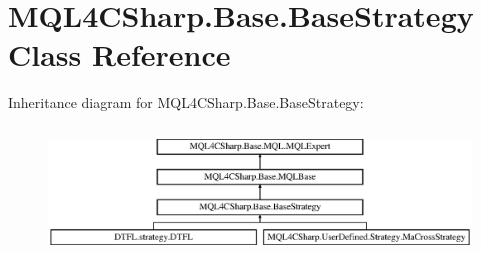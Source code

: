\hypertarget{class_m_q_l4_c_sharp_1_1_base_1_1_base_strategy}{}\section{M\+Q\+L4\+C\+Sharp.\+Base.\+Base\+Strategy Class Reference}
\label{class_m_q_l4_c_sharp_1_1_base_1_1_base_strategy}
Inheritance diagram for M\+Q\+L4\+C\+Sharp.\+Base.\+Base\+Strategy\+:\begin{figure}[H]
\begin{center}
\leavevmode
\includegraphics[height=3.446154cm]{class_m_q_l4_c_sharp_1_1_base_1_1_base_strategy}
\end{center}
\end{figure}
